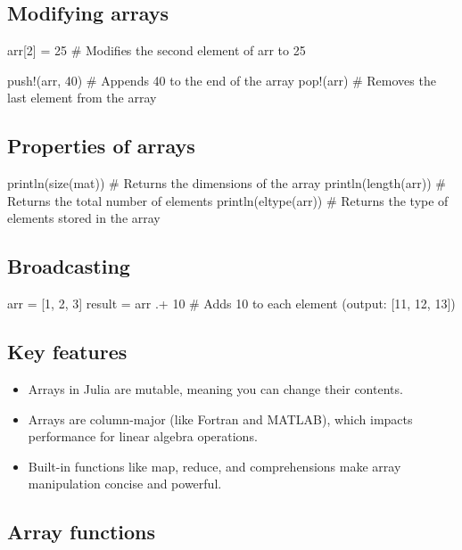 \documentclass{report}
\begin{document}
    \bigbreak \noindent 
    \subsection{Modifying arrays}
    \bigbreak \noindent 
    \begin{jlcode}
    arr[2] = 25  # Modifies the second element of arr to 25

    push!(arr, 40)  # Appends 40 to the end of the array
    pop!(arr)  # Removes the last element from the array
    \end{jlcode}

    \bigbreak \noindent 
    \subsection{Properties of arrays}
    \bigbreak \noindent 
    \begin{jlcode}
    println(size(mat))  # Returns the dimensions of the array
    println(length(arr))  # Returns the total number of elements
    println(eltype(arr))  # Returns the type of elements stored in the array
    \end{jlcode}

    \bigbreak \noindent 
    \subsection{Broadcasting}
    \bigbreak \noindent 
    \begin{jlcode}
    arr = [1, 2, 3]
    result = arr .+ 10  # Adds 10 to each element (output: [11, 12, 13])
    \end{jlcode}

    \bigbreak \noindent 
    \subsection{Key features}
    \begin{itemize}
        \item Arrays in Julia are mutable, meaning you can change their contents.
        \item Arrays are column-major (like Fortran and MATLAB), which impacts performance for linear algebra operations.
        \item Built-in functions like map, reduce, and comprehensions make array manipulation concise and powerful.
    \end{itemize}

    \bigbreak \noindent 
    \subsection{Array functions}
    \bigbreak \noindent 
\end{document}

